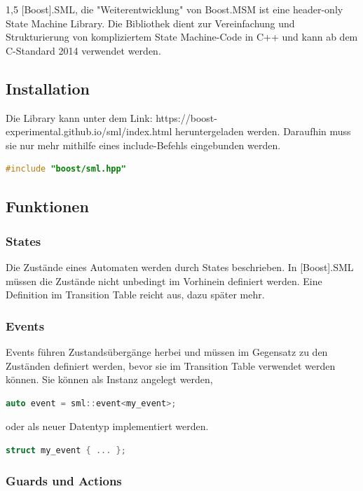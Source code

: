 \documentclass[a4paper]{article}
\begin{document}
\begin{spacing}{1,5}
[Boost].SML, die "Weiterentwicklung" von Boost.MSM ist eine header-only State Machine Library. Die Bibliothek dient zur Vereinfachung und Strukturierung von kompliziertem State Machine-Code in C++ und kann ab dem C-Standard 2014 verwendet werden.

\subsection{Installation}

Die Library kann unter dem Link: https://boost-experimental.github.io/sml/index.html heruntergeladen werden. Daraufhin muss sie nur mehr mithilfe eines include-Befehls eingebunden werden.
\begin{lstlisting}[language=c++]
#include "boost/sml.hpp"
\end{lstlisting}

\subsection{Funktionen}

\subsubsection{States}

Die Zustände eines Automaten werden durch States beschrieben. In [Boost].SML müssen die Zustände nicht unbedingt im Vorhinein definiert werden. Eine Definition im Transition Table reicht aus, dazu später mehr.

\subsubsection{Events}

Events führen Zustandsübergänge herbei und müssen im Gegensatz zu den Zuständen definiert werden, bevor sie im Transition Table verwendet werden können. Sie können als Instanz angelegt werden, \begin{lstlisting}[language=c++]
auto event = sml::event<my_event>;
\end{lstlisting} oder als neuer Datentyp implementiert werden.
\begin{lstlisting}[language=c++]
struct my_event { ... };
\end{lstlisting}

\newpage

\subsubsection{Guards und Actions}


\end{spacing}
\end{document}

